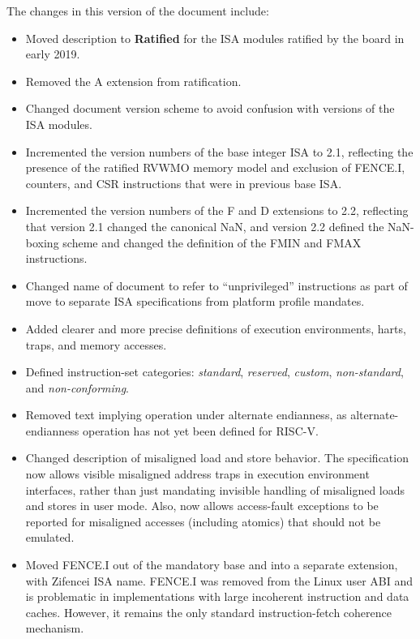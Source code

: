 The changes in this version of the document include:
\vspace{-0.2in}
\begin{itemize}
\parskip 0pt
\itemsep 1pt
\item Moved description to {\bf Ratified} for the  ISA modules ratified
  by the board in early 2019.
\item Removed the A extension from ratification.
\item Changed document version scheme to avoid confusion with versions
  of the ISA modules.
\item Incremented the version numbers of the base integer ISA to 2.1,
  reflecting the presence of the ratified RVWMO memory model and
  exclusion of FENCE.I, counters, and CSR instructions that were in
  previous base ISA.
\item Incremented the version numbers of the F and D extensions to 2.2,
  reflecting that version 2.1 changed the canonical NaN, and version
  2.2 defined the NaN-boxing scheme and changed the definition of the
  FMIN and FMAX instructions.
\item Changed name of document to refer to ``unprivileged''
  instructions as part of move to separate ISA specifications from
  platform profile mandates.
\item Added clearer and more precise definitions of execution
  environments, harts, traps, and memory accesses.
\item Defined instruction-set categories: {\em standard}, {\em
  reserved}, {\em custom}, {\em non-standard}, and {\em
  non-conforming}.
\item Removed text implying operation under alternate endianness, as
  alternate-endianness operation has not yet been defined for RISC-V.
\item Changed description of misaligned load and store behavior.  The
  specification now allows visible misaligned address traps in
  execution environment interfaces, rather than just mandating
  invisible handling of misaligned loads and stores in user mode.
  Also, now allows access-fault exceptions to be reported for misaligned
  accesses (including atomics) that should not be emulated. 
\item Moved FENCE.I out of the mandatory base and into a separate extension,
  with Zifencei ISA name.  FENCE.I was removed from the Linux user ABI and is
  problematic in implementations with large incoherent instruction and
  data caches.  However, it remains the only standard
  instruction-fetch coherence mechanism.

\end{itemize}
